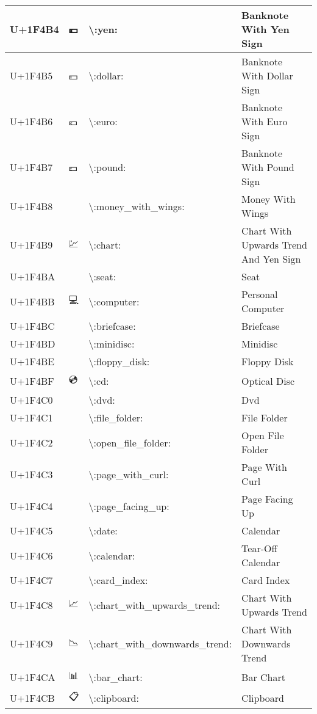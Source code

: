 \begin{table}[h]
\begin{tabulary}{\linewidth}{|L|L|L|L|}
\hline
U+1F4B4 & 💴 & {\textbackslash}:yen: & Banknote With Yen Sign \\
\hline
U+1F4B5 & 💵 & {\textbackslash}:dollar: & Banknote With Dollar Sign \\
\hline
U+1F4B6 & 💶 & {\textbackslash}:euro: & Banknote With Euro Sign \\
\hline
U+1F4B7 & 💷 & {\textbackslash}:pound: & Banknote With Pound Sign \\
\hline
U+1F4B8 & 💸 & {\textbackslash}:money\_with\_wings: & Money With Wings \\
\hline
U+1F4B9 & 💹 & {\textbackslash}:chart: & Chart With Upwards Trend And Yen Sign \\
\hline
U+1F4BA & 💺 & {\textbackslash}:seat: & Seat \\
\hline
U+1F4BB & 💻 & {\textbackslash}:computer: & Personal Computer \\
\hline
U+1F4BC & 💼 & {\textbackslash}:briefcase: & Briefcase \\
\hline
U+1F4BD & 💽 & {\textbackslash}:minidisc: & Minidisc \\
\hline
U+1F4BE & 💾 & {\textbackslash}:floppy\_disk: & Floppy Disk \\
\hline
U+1F4BF & 💿 & {\textbackslash}:cd: & Optical Disc \\
\hline
U+1F4C0 & 📀 & {\textbackslash}:dvd: & Dvd \\
\hline
U+1F4C1 & 📁 & {\textbackslash}:file\_folder: & File Folder \\
\hline
U+1F4C2 & 📂 & {\textbackslash}:open\_file\_folder: & Open File Folder \\
\hline
U+1F4C3 & 📃 & {\textbackslash}:page\_with\_curl: & Page With Curl \\
\hline
U+1F4C4 & 📄 & {\textbackslash}:page\_facing\_up: & Page Facing Up \\
\hline
U+1F4C5 & 📅 & {\textbackslash}:date: & Calendar \\
\hline
U+1F4C6 & 📆 & {\textbackslash}:calendar: & Tear-Off Calendar \\
\hline
U+1F4C7 & 📇 & {\textbackslash}:card\_index: & Card Index \\
\hline
U+1F4C8 & 📈 & {\textbackslash}:chart\_with\_upwards\_trend: & Chart With Upwards Trend \\
\hline
U+1F4C9 & 📉 & {\textbackslash}:chart\_with\_downwards\_trend: & Chart With Downwards Trend \\
\hline
U+1F4CA & 📊 & {\textbackslash}:bar\_chart: & Bar Chart \\
\hline
U+1F4CB & 📋 & {\textbackslash}:clipboard: & Clipboard \\

\end{tabulary}
\end{table}
